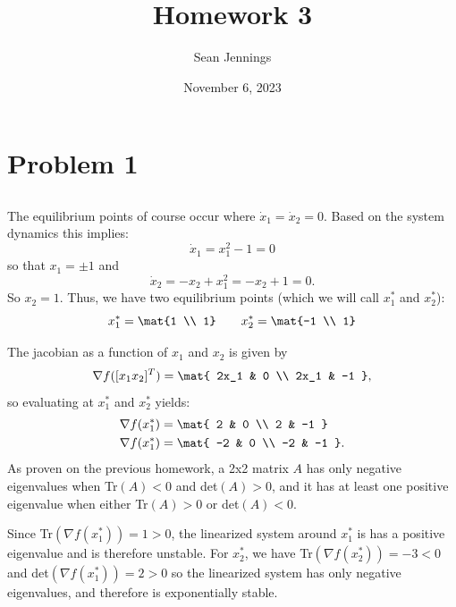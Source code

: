 \documentclass{homework}
\title{Homework 3}
\author{Sean Jennings}
\date{November 6, 2023}
\begin{document}
\maketitle

\section{Problem 1}
\subsection{}
The equilibrium points of course occur where $\dot{x}_1 = \dot{x}_2 = 0$. Based on the
system dynamics this implies:
\begin{equation*}
    \dot{x}_1 = x_1^2 - 1 = 0
\end{equation*}
so that $x_1 = \pm 1$ and 
\begin{equation*}
    \dot{x}_2 = -x_2 + x_1^2 = -x_2 + 1 = 0.
\end{equation*}
So $x_2 = 1$. Thus, we have two equilibrium points (which we will call $x_1^*$ and $x_2^*$):
\begin{equation*}
    x_1^* = \mat{1 \\ 1} \qquad x_2^* = \mat{-1 \\ 1}
\end{equation*}

The jacobian as a function of $x_1$ and $x_2$ is given by
\begin{equation*}
    \nabla f([x_1 x_2]^T) = \mat{
        2x_1 & 0 \\
        2x_1 & -1
    },
\end{equation*}
so evaluating at $x_1^*$ and $x_2^*$ yields:
\begin{align*}
    \nabla f(x_1^*) &= \mat{
        2 & 0 \\
        2 & -1
    } \\
    \nabla f(x_1^*) &= \mat{
        -2 & 0 \\
        -2 & -1
    }.
\end{align*}
As proven on the previous homework, a 2x2 matrix $A$ has only negative eigenvalues
when Tr$(A) < 0$ and det$(A) > 0$, and it has at least one positive eigenvalue when
either Tr$(A) > 0$ or det$(A) < 0$.

Since Tr$(\nabla f(x_1^*)) = 1 > 0$, the linearized system around $x_1^*$ is 
has a positive eigenvalue and is therefore unstable. For $x_2^*$, we have
Tr$(\nabla f(x_2^*)) = -3 < 0$ and det$(\nabla f(x_1^*)) = 2 > 0$
so the linearized system has only negative eigenvalues, and therefore is
exponentially stable.
\end{document}

